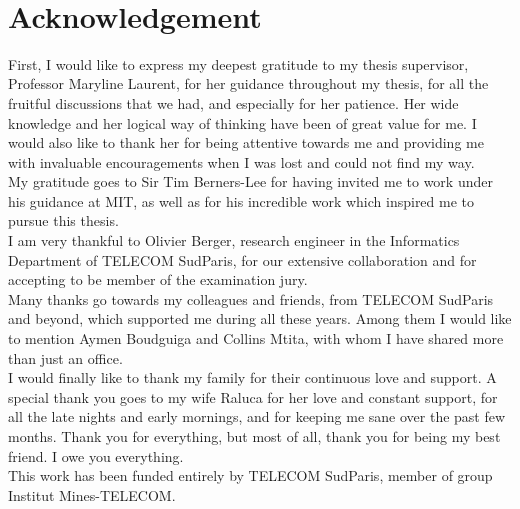 \documentclass[a4paper]{book}
\begin{document}
\sloppy
\thispagestyle{empty}
\pagestyle{empty}


~\\
\newpage


\thispagestyle{empty}
\pagestyle{empty}

\chapter*{Acknowledgement}
\thispagestyle{empty}
\pagestyle{empty}
First, I would like to express my deepest gratitude to my thesis supervisor, Professor Maryline Laurent, for her guidance throughout my thesis, for all the fruitful discussions that we had, and especially for her patience. Her wide knowledge and her logical way of thinking have been of great value for me. I would also like to thank her for being attentive towards me and providing me with invaluable encouragements when I was lost and could not find my way.\\

My gratitude goes to Sir Tim Berners-Lee for having invited me to work under his guidance at MIT, as well as for his incredible work which inspired me to pursue this thesis.\\

I am very thankful to Olivier Berger, research engineer in the Informatics Department of TELECOM SudParis, for our extensive collaboration and for accepting to be member of the examination jury.\\

Many thanks go towards my colleagues and friends, from TELECOM SudParis and beyond, which supported me during all these years. Among them I would like to mention Aymen Boudguiga and Collins Mtita, with whom I have shared more than just an office.\\

I would finally like to thank my family for their continuous love and support. A special thank you goes to my wife Raluca for her love and constant support, for all the late nights and early mornings, and for keeping me sane over the past few months. Thank you for everything, but most of all, thank you for being my best friend. I owe you everything.\\

This work has been funded entirely by TELECOM SudParis, member of group Institut Mines-TELECOM.

\end{document}
